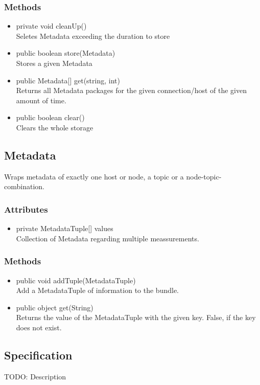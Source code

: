 \subsubsection{Methods}
\begin{itemize}
	\item private  void cleanUp()\\
	Seletes Metadata exceeding the duration to store
	\item public  boolean store(Metadata)\\
	Stores a given Metadata
	\item public  Metadata[] get(string, int)\\
	Returns all Metadata packages for the given connection/host of the given amount of time.
	\item public  boolean clear()\\
	Clears the whole storage
\end{itemize}


\subsection{Metadata}
Wraps metadata of exactly one host or node, a topic or a node-topic-combination.

\subsubsection{Attributes}
\begin{itemize}
	\item private  MetadataTuple[] values\\
	Collection of Metadata regarding multiple meassurements.
\end{itemize}
\subsubsection{Methods}
\begin{itemize}
	\item public  void addTuple(MetadataTuple)\\
	Add a MetadataTuple of information to the bundle.
	\item public  object get(String)\\
	Returns the value of the MetadataTuple with the given key. False, if the key does not exist.
\end{itemize}


\subsection{Specification}
TODO: Description


